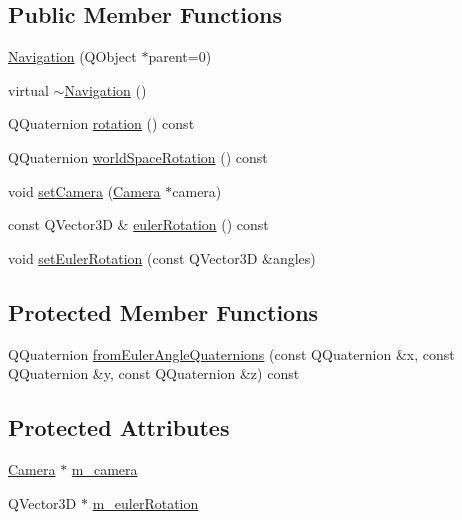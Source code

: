 \subsection*{Public Member Functions}
\begin{DoxyCompactItemize}
\item 
\hyperlink{class_navigation_a9848e09ca6fab3590ffdb0e1c188f31d}{Navigation} (Q\+Object $\ast$parent=0)
\item 
virtual \hyperlink{class_navigation_addd4022d716df48f4e55a1db69361ba7}{$\sim$\+Navigation} ()
\item 
Q\+Quaternion \hyperlink{class_navigation_a264e178e874b62aec38c9986a234d044}{rotation} () const 
\item 
Q\+Quaternion \hyperlink{class_navigation_adedf1fd31c40b2ba7461f67387bbb00c}{world\+Space\+Rotation} () const 
\item 
void \hyperlink{class_navigation_a945e0c9bd30f3c66da040f3242864027}{set\+Camera} (\hyperlink{class_camera}{Camera} $\ast$camera)
\item 
const Q\+Vector3\+D \& \hyperlink{class_navigation_ac756f0b773b771556505a8f20a5f2cf1}{euler\+Rotation} () const 
\item 
void \hyperlink{class_navigation_a4d9b8c12ac091a1db0c3b89f0e36cedd}{set\+Euler\+Rotation} (const Q\+Vector3\+D \&angles)
\end{DoxyCompactItemize}
\subsection*{Protected Member Functions}
\begin{DoxyCompactItemize}
\item 
Q\+Quaternion \hyperlink{class_navigation_a210a31fd6fc626468793b4dbeefcaf2c}{from\+Euler\+Angle\+Quaternions} (const Q\+Quaternion \&x, const Q\+Quaternion \&y, const Q\+Quaternion \&z) const 
\end{DoxyCompactItemize}
\subsection*{Protected Attributes}
\begin{DoxyCompactItemize}
\item 
\hyperlink{class_camera}{Camera} $\ast$ \hyperlink{class_navigation_a76a3e3ea5f8d81a19b22806eb3536302}{m\+\_\+camera}
\item 
Q\+Vector3\+D $\ast$ \hyperlink{class_navigation_a6b056244895c4250c697f6b924874b05}{m\+\_\+euler\+Rotation}
\end{DoxyCompactItemize}
